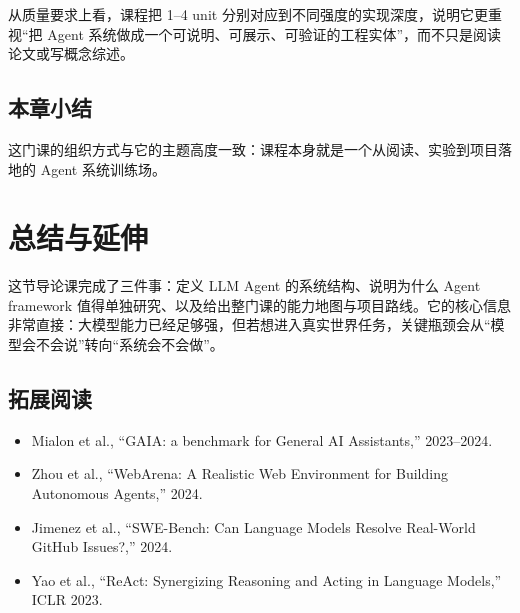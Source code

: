 \documentclass[a4paper]{article}
\begin{document}
从质量要求上看，课程把 1--4 unit 分别对应到不同强度的实现深度，说明它更重视``把 Agent 系统做成一个可说明、可展示、可验证的工程实体''，而不只是阅读论文或写概念综述。

\subsection{本章小结}

这门课的组织方式与它的主题高度一致：课程本身就是一个从阅读、实验到项目落地的 Agent 系统训练场。

\section{总结与延伸}

这节导论课完成了三件事：定义 LLM Agent 的系统结构、说明为什么 Agent framework 值得单独研究、以及给出整门课的能力地图与项目路线。它的核心信息非常直接：大模型能力已经足够强，但若想进入真实世界任务，关键瓶颈会从``模型会不会说''转向``系统会不会做''。

\subsection{拓展阅读}

\begin{itemize}
    \item Mialon et al., ``GAIA: a benchmark for General AI Assistants,'' 2023--2024.
    \item Zhou et al., ``WebArena: A Realistic Web Environment for Building Autonomous Agents,'' 2024.
    \item Jimenez et al., ``SWE-Bench: Can Language Models Resolve Real-World GitHub Issues?,'' 2024.
    \item Yao et al., ``ReAct: Synergizing Reasoning and Acting in Language Models,'' ICLR 2023.
\end{itemize}
\end{document}
